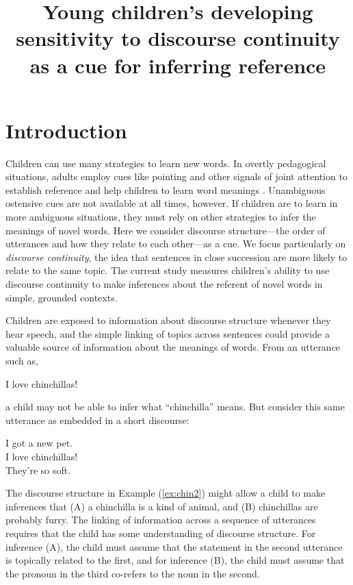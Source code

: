 \documentclass[man]{apa2}
\title{Young children's developing sensitivity to discourse continuity as a cue for inferring reference}
\begin{document}
\maketitle                            


\section{Introduction}

Children can use many strategies to learn new words.  In overtly pedagogical situations, adults employ cues like pointing and other signals of joint attention to establish reference and help children to learn word meanings \cite{bakeman1984,csibra2010,hollich2000}.  Unambiguous ostensive cues are not available at all times, however.  If children are to learn in more ambiguous situations, they must rely on other strategies to infer the meanings of novel words. Here we consider discourse structure---the order of utterances and how they relate to each other---as a cue. We focus particularly on \emph{discourse continuity}, the idea that sentences in close succession are more likely to relate to the same topic. The current study measures children's ability to use discourse continuity to make inferences about the referent of novel words in simple, grounded contexts.

Children are exposed to information about discourse structure whenever they hear speech, and the simple linking of topics across sentences could provide a valuable source of information about the meanings of words. From an utterance such as,

\begin{example}
\label{ex:chin1}
I love chinchillas!
\end{example}

\noindent a child may not be able to infer what ``chinchilla'' means. But consider this same utterance as embedded in a short discourse:

\begin{example}
\label{ex:chin2}
I got a new pet. \\ I love chinchillas! \\ They're so soft.
\end{example}

\noindent The discourse structure in Example (\ref{ex:chin2}) might allow a child to make inferences that (A) a chinchilla is a kind of animal, and (B) chinchillas are probably furry.  The linking of information across a sequence of utterances requires that the child has some understanding of discourse structure.  For inference (A), the child must assume that the statement in the second utterance is topically related to the first, and for inference (B), the child must assume that the pronoun in the third co-refers to the noun in the second. 
\end{document}
